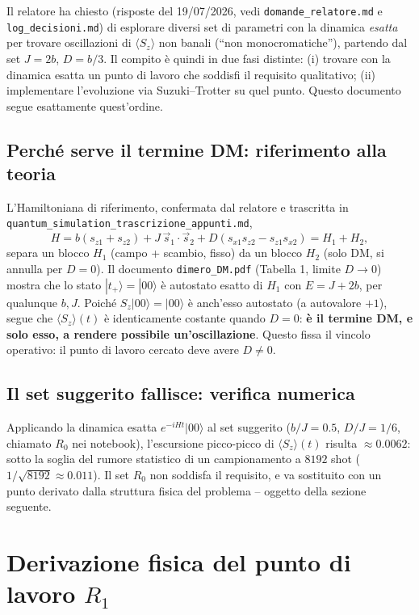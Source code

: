 \documentclass[11pt,a4paper]{article}
\begin{document}
Il relatore ha chiesto (risposte del 19/07/2026, vedi
\texttt{domande\_relatore.md} e \texttt{log\_decisioni.md}) di esplorare
diversi set di parametri con la dinamica \emph{esatta} per trovare
oscillazioni di $\langle S_z\rangle$ non banali (``non monocromatiche''),
partendo dal set $J=2b$, $D=b/3$. Il compito è quindi in due fasi distinte:
(i) trovare con la dinamica esatta un punto di lavoro che soddisfi il
requisito qualitativo; (ii) implementare l'evoluzione via Suzuki--Trotter su
quel punto. Questo documento segue esattamente quest'ordine.

\subsection{Perché serve il termine DM: riferimento alla teoria}

L'Hamiltoniana di riferimento, confermata dal relatore e trascritta in
\texttt{quantum\_simulation\_trascrizione\_appunti.md},
$$H = b(s_{z1}+s_{z2}) + J\,\vec s_1\cdot\vec s_2 + D(s_{x1}s_{z2}-s_{z1}s_{x2}) = H_1+H_2,$$
separa un blocco $H_1$ (campo + scambio, fisso) da un blocco $H_2$ (solo DM,
si annulla per $D=0$). Il documento \texttt{dimero\_DM.pdf} (Tabella 1, limite
$D\to0$) mostra che lo stato $|t_+\rangle=|00\rangle$ è autostato esatto di
$H_1$ con $E=J+2b$, per qualunque $b,J$. Poiché $S_z|00\rangle=|00\rangle$ è
anch'esso autostato (a autovalore $+1$), segue che $\langle S_z\rangle(t)$ è
identicamente costante quando $D=0$: \textbf{è il termine DM, e solo esso, a
rendere possibile un'oscillazione}. Questo fissa il vincolo operativo: il
punto di lavoro cercato deve avere $D\neq0$.

\subsection{Il set suggerito fallisce: verifica numerica}

Applicando la dinamica esatta $e^{-iHt}|00\rangle$ al set suggerito
($b/J=0.5$, $D/J=1/6$, chiamato $R_0$ nei notebook), l'escursione
picco-picco di $\langle S_z\rangle(t)$ risulta $\approx0.0062$: sotto la
soglia del rumore statistico di un campionamento a $8192$ shot
($1/\sqrt{8192}\approx0.011$). Il set $R_0$ non soddisfa il requisito, e va
sostituito con un punto derivato dalla struttura fisica del problema --
oggetto della sezione seguente.

\section{Derivazione fisica del punto di lavoro $R_1$}
\end{document}
